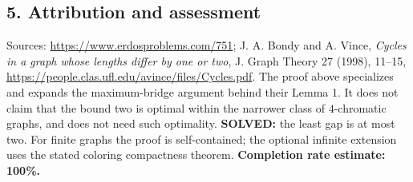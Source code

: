 \subsection*{5. Attribution and assessment}
Sources: \url{https://www.erdosproblems.com/751}; J. A. Bondy and A. Vince, \emph{Cycles in a graph whose lengths differ by one or two}, J. Graph Theory 27 (1998), 11--15, \url{https://people.clas.ufl.edu/avince/files/Cycles.pdf}. The proof above specializes and expands the maximum-bridge argument behind their Lemma 1. It does not claim that the bound two is optimal within the narrower class of $4$-chromatic graphs, and does not need such optimality.
\textbf{SOLVED:} the least gap is at most two. For finite graphs the proof is self-contained; the optional infinite extension uses the stated coloring compactness theorem.
\textbf{Completion rate estimate: 100\%.}
